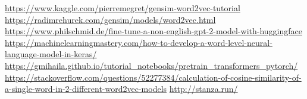 \documentclass[10pt]{article}
\begin{document}
\begin{flushleft}
	\url{https://www.kaggle.com/pierremegret/gensim-word2vec-tutorial}
	\url{https://radimrehurek.com/gensim/models/word2vec.html}
	\url{https://www.philschmid.de/fine-tune-a-non-english-gpt-2-model-with-huggingface}
	\url{https://machinelearningmastery.com/how-to-develop-a-word-level-neural-language-model-in-keras/}
	\url{https://gmihaila.github.io/tutorial_notebooks/pretrain_transformers_pytorch/}
	\url{https://stackoverflow.com/questions/52277384/calculation-of-cosine-similarity-of-a-single-word-in-2-different-word2vec-models}
	\url{http://stanza.run/}
\end{flushleft}
\end{document}
